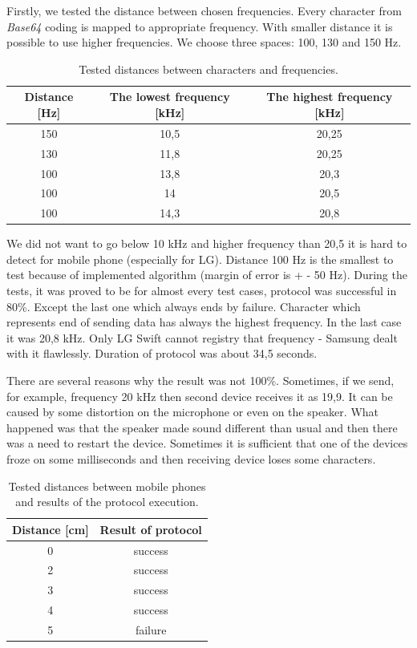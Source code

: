 \documentclass[11pt,titlepage]{article}
\theoremstyle{plain}
\begin{document}
Firstly, we tested  the distance between chosen frequencies. Every character from \textit{Base64} coding is mapped to appropriate frequency. With smaller distance it is possible to use higher frequencies. We choose three spaces: 100, 130 and 150 Hz.
\begin{table}[H]
	\centering
	\begin{tabular}{| c | c | c |}
		\hline
		Distance [Hz] & The lowest frequency [kHz] & The highest frequency [kHz]\\
		\hline
		150 & 10,5 & 20,25 \\
		\hline
		130 & 11,8 & 20,25 \\
		\hline
		100 & 13,8 & 20,3 \\
		\hline
		100 & 14 & 20,5 \\
		\hline
		100 & 14,3 & 20,8 \\
		\hline
	\end{tabular}
	\caption{Tested distances between characters and frequencies.}
\end{table}

We did not want to go below 10 kHz and higher frequency than 20,5 it is hard to detect for mobile phone (especially for LG). Distance 100 Hz is the smallest to test because of implemented algorithm (margin of error is + - 50 Hz). During the tests, it was proved to be for almost every test cases, protocol was successful in 80\%. Except the last one which always ends by failure. Character which represents end of sending data has always the highest frequency. In the last case it was 20,8 kHz. Only LG Swift cannot registry that frequency - Samsung dealt with it flawlessly. Duration of protocol was about 34,5 seconds.

\vspace{5mm}

There are several reasons why the result was not 100\%. Sometimes, if we send, for example, frequency 20 kHz then second device receives it as 19,9. It can be caused by some distortion on the microphone or even on the speaker. What happened was that the speaker made sound different than usual and then there was a need to restart the device. Sometimes it is sufficient that one of the devices froze on some milliseconds and then receiving device loses some characters. 

\vspace{5mm}

\begin{table}[H]
	\centering
	\begin{tabular}{| c | c |}
		\hline
		Distance [cm] & Result of protocol \\
		\hline
		0 & success \\
		\hline
		2 & success \\
		\hline
		3 & success \\
		\hline
		4 & success \\
		\hline
		5 & failure \\
		\hline
	\end{tabular}
	\caption{Tested distances between mobile phones and results of the protocol execution.}
\end{table}
\end{document}
